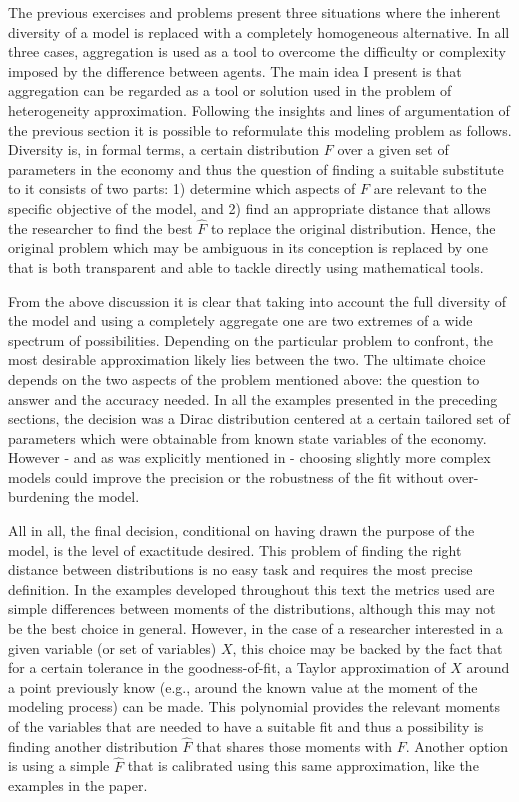 \documentclass[english, a4paper, 12pt]{article}
\begin{document}
The previous exercises and problems present three situations where the inherent diversity of a model is replaced with a completely homogeneous alternative. In all three cases, aggregation is used as a tool to overcome the difficulty or complexity imposed by the difference between agents. The main idea I present is that aggregation can be regarded as a tool or solution used in the problem of heterogeneity approximation. Following the insights and lines of argumentation of the previous section it is possible to reformulate this modeling problem as follows. Diversity is, in formal terms, a certain distribution $F$ over a given set of parameters in the economy and thus the question of finding a suitable substitute to it consists of two parts: 1) determine which aspects of $F$ are relevant to the specific objective of the model, and 2) find an appropriate distance that allows the researcher to find the best $\hat{F}$ to replace the original distribution. Hence, the original problem which may be ambiguous in its conception is replaced by one that is both transparent and able to tackle directly using mathematical tools. 

From the above discussion it is clear that taking into account the full diversity of the model and using a completely aggregate one are two extremes of a wide spectrum of possibilities. Depending on the particular problem to confront, the most desirable approximation likely lies between the two. The ultimate choice depends on the two aspects of the problem mentioned above: the question to answer and the accuracy needed. In all the examples presented in the preceding sections, the decision was a Dirac distribution centered at a certain tailored set of parameters which were obtainable from known state variables of the economy. However - and as was explicitly mentioned in  - choosing slightly more complex models could improve the precision or the robustness of the fit without over-burdening the model.

All in all, the final decision, conditional on having drawn the purpose of the model, is the level of exactitude desired. This problem of finding the right distance between distributions is no easy task and requires the most precise definition. In the examples developed throughout this text the metrics used are simple differences between moments of the distributions, although this may not be the best choice in general. However, in the case of a researcher interested in a given variable (or set of variables) $X$, this choice may be backed by the fact that for a certain tolerance in the goodness-of-fit, a Taylor approximation of $X$ around a point previously know (e.g., around the known value at the moment of the modeling process) can be made. This polynomial provides the relevant moments of the variables that are needed to have a suitable fit and thus a possibility is finding another distribution $\hat{F}$ that shares those moments with $F$. Another option is using a simple $\hat{F}$ that is calibrated using this same approximation, like the examples in the paper.
\end{document}
